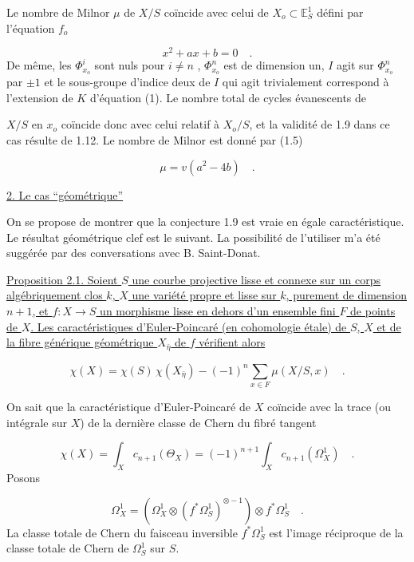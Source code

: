 Le nombre de Milnor $\mu$ de $X/S$ coïncide avec celui de $X_o \subset \mathbb{E}_S^1$ défini par l'équation $f_o$

\begin{equation}\tag{1}
x^2 + ax + b = 0 \quad .
\end{equation}
De même, les $\Phi^i_{x_o}$ sont nuls pour $i \neq n$ , $\Phi^n_{x_o}$ est de dimension un, $I$ agit sur $\Phi^n_{x_o}$ par $\pm 1$ et le sous-groupe d'indice deux de $I$ qui agit trivialement correspond à l'extension de $K$ d'équation (1). Le nombre total de cycles évanescents de 



$X/S$ en $x_o$ coïncide donc avec celui relatif à $X_o/S$, et la validité de 1.9 dans ce cas résulte de 1.12. Le nombre de Milnor est donné par (1.5)

\begin{equation}\tag{1.13.1}
\mu=v(a^2-4b) \quad .
\end{equation}

\underline{2. Le cas ``géométrique''}

On se propose de montrer que la conjecture 1.9 est vraie en égale caractéristique. Le résultat géométrique clef est le suivant. La possibilité de l'utiliser m'a été suggérée par des conversations avec B. Saint-Donat.

\underline{Proposition 2.1. Soient $S$ une courbe projective lisse et connexe sur un corps algébriquement clos $k$, $X$ une variété propre et lisse sur $k$, purement de dimension $n+1$, et $f:X\to S$ un morphisme lisse en dehors d'un ensemble fini $F$ de points de $X$. Les caractéristiques d'Euler-Poincaré (en cohomologie étale) de $S$, $X$ et de la fibre générique géométrique $X_{\bar\eta}$ de $f$ vérifient alors}

\begin{equation}\tag{2.1.1}
\chi(X)=\chi(S)\,\chi(X_{\bar\eta})-(-1)^n\sum_{x\in F}\mu(X/S,x) \quad .
\end{equation}

On sait que la caractéristique d'Euler-Poincaré de $X$ coïncide avec la trace (ou intégrale sur $X$) de la dernière classe de Chern du fibré tangent

\begin{equation*}
\chi(X)=\int_X c_{n+1}(\Theta_X)=(-1)^{n+1}\int_X c_{n+1}(\Omega_X^1) \quad .
\end{equation*}
Posons

\begin{equation*}
\Omega_X^1=\left(\Omega_X^1\otimes(f^*\Omega_S^1)^{\otimes-1}\right)\otimes f^*\Omega_S^1 \quad .
\end{equation*}
La classe totale de Chern du faisceau inversible $f^*\Omega_S^1$ est l'image réciproque de la classe totale de Chern de $\Omega_S^1$ sur $S$.


